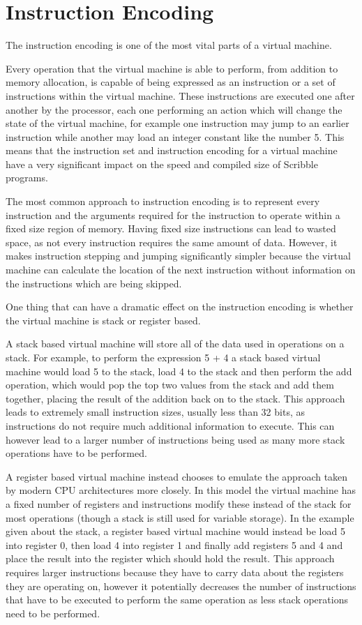 \documentclass[]{final_report}
\begin{document}
\chapter{Instruction Encoding}

The instruction encoding is one of the most vital parts of a virtual machine.

Every operation that the virtual machine is able to perform, from addition to memory allocation, is capable of being expressed as an instruction or a set of instructions within the virtual machine.
These instructions are executed one after another by the processor, each one performing an action which will change the state of the virtual machine, for example one instruction may jump to an earlier instruction while another may load an integer constant like the number 5.
This means that the instruction set and instruction encoding for a virtual machine have a very significant impact on the speed and compiled size of Scribble programs.

The most common approach to instruction encoding is to represent every instruction and the arguments required for the instruction to operate within a fixed size region of memory. Having fixed size instructions can lead to wasted space, as not every instruction requires the same amount of data. However, it makes instruction stepping and jumping significantly simpler because the virtual machine can calculate the location of the next instruction without information on the instructions which are being skipped.

One thing that can have a dramatic effect on the instruction encoding is whether the virtual machine is stack or register based.

A stack based virtual machine will store all of the  data used in operations on a stack. For example, to perform the expression 5 + 4 a stack based virtual machine would load 5 to the stack, load 4 to the stack and then perform the add operation, which would pop the top two values from the stack and add them together, placing the result of the addition back on to the stack. This approach leads to extremely small instruction sizes, usually less than 32 bits, as instructions do not require much additional information to execute. This can however lead to a larger number of instructions being used as many more stack operations have to be performed.

A register based virtual machine instead chooses to emulate the approach taken by modern CPU architectures more closely. In this model the virtual machine has a fixed number of registers and instructions modify these instead of the stack for most operations (though a stack is still used for variable storage). In the example given about the stack, a register based virtual machine would instead be load 5 into register 0, then load 4 into register 1 and finally add registers 5 and 4 and place the result into the register which should hold the result. This approach requires larger instructions because they have to carry data about the registers they are operating on, however it potentially decreases the number of instructions that have to be executed to perform the same operation as less stack operations need to be performed. 
\end{document}
